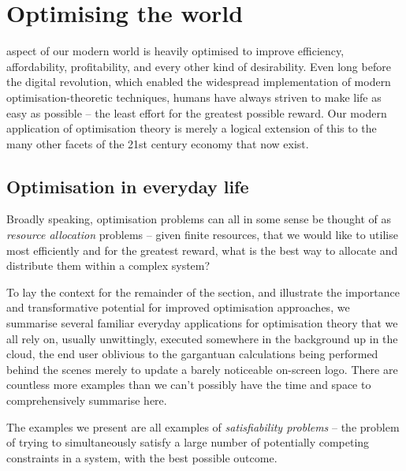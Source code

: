 %
%

\section{Optimising the world}\label{sec:optimising_the_world}

\newline

 aspect of our modern world is heavily optimised to improve efficiency, affordability, profitability, and every other kind of desirability. Even long before the digital revolution, which enabled the widespread implementation of modern optimisation-theoretic techniques, humans have always striven to make life as easy as possible -- the least effort for the greatest possible reward. Our modern application of optimisation theory is merely a logical extension of this to the many other facets of the 21st century economy that now exist.

\subsection{Optimisation in everyday life}

Broadly speaking, optimisation problems can all in some sense be thought of as \textit{resource allocation} problems -- given finite resources, that we would like to utilise most efficiently and for the greatest reward, what is the best way to allocate and distribute them within a complex system?

To lay the context for the remainder of the section, and illustrate the importance and transformative potential for improved optimisation approaches, we summarise several familiar everyday applications for optimisation theory that we all rely on, usually unwittingly, executed somewhere in the background up in the cloud, the end user oblivious to the gargantuan calculations being performed behind the scenes merely to update a barely noticeable on-screen logo. There are countless more examples than we can't possibly have the time and space to comprehensively summarise here.

The examples we present are all examples of \textit{satisfiability problems} -- the problem of trying to simultaneously satisfy a large number of potentially competing constraints in a system, with the best possible outcome.

